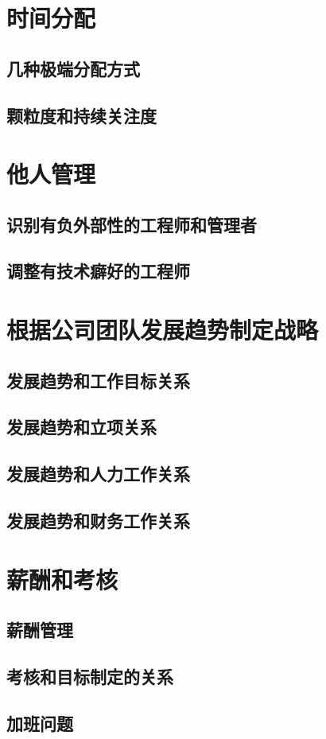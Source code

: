 
\section{时间分配}
\subsection{几种极端分配方式}
\subsection{颗粒度和持续关注度}

\section{他人管理}
\subsection{识别有负外部性的工程师和管理者}
\subsection{调整有技术癖好的工程师}

\section{根据公司团队发展趋势制定战略}
\subsection{发展趋势和工作目标关系}
\subsection{发展趋势和立项关系}
\subsection{发展趋势和人力工作关系}
\subsection{发展趋势和财务工作关系}

\section{薪酬和考核}
\subsection{薪酬管理}
\subsection{考核和目标制定的关系}
\subsection{加班问题}

